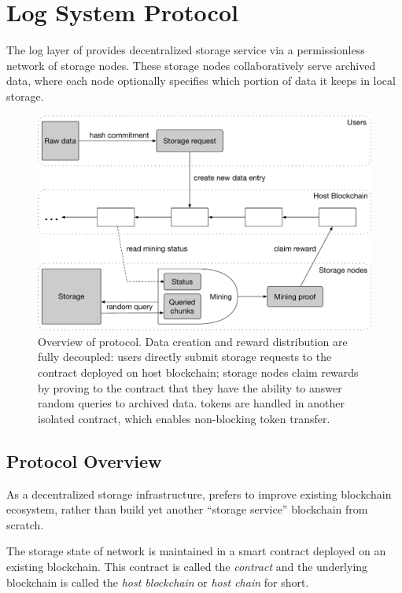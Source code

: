 \section{Log System Protocol}


The log layer of \project provides decentralized storage service via a permissionless network of storage nodes.
These storage nodes collaboratively serve archived data,
where each node optionally specifies which portion of data it keeps in local storage.

\begin{figure}[H]
		\includegraphics[width=\textwidth]{figure/protocol_overview.pdf}
		\caption{Overview of \project protocol. Data creation and reward distribution are fully decoupled: users directly submit storage requests to the \project contract deployed on host blockchain; storage nodes claim rewards by proving to the \project contract that they have the ability to answer random queries to archived data. \project tokens are handled in another isolated contract, which enables non-blocking token transfer.}
		\label{fig:overview}
\end{figure}

\subsection{Protocol Overview}

As a decentralized storage infrastructure, \project prefers to improve existing blockchain ecosystem, rather than build yet another ``storage service'' blockchain from scratch.

The storage state of \project network is maintained in a smart contract deployed on an existing blockchain.
This contract is called the \project \emph{contract} and the underlying blockchain is called the \emph{host blockchain} or \emph{host chain} for short.

